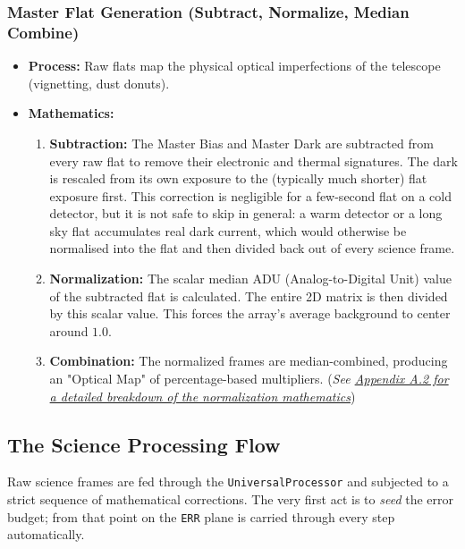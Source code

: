 \documentclass[11pt,a4paper]{article}
\begin{document}
\subsubsection{Master Flat Generation (Subtract, Normalize, Median Combine)}
\begin{itemize}[leftmargin=*]
    \item \textbf{Process:} Raw flats map the physical optical imperfections of the telescope (vignetting, dust donuts). 
    \item \textbf{Mathematics:} 
    \begin{enumerate}
        \item \textbf{Subtraction:} The Master Bias and Master Dark are subtracted from every raw flat to remove their electronic and thermal signatures. The dark is rescaled from its own exposure to the (typically much shorter) flat exposure first. This correction is negligible for a few-second flat on a cold detector, but it is not safe to skip in general: a warm detector or a long sky flat accumulates real dark current, which would otherwise be normalised into the flat and then divided back out of every science frame.
        \item \textbf{Normalization:} The scalar median ADU (Analog-to-Digital Unit) value of the subtracted flat is calculated. The entire 2D matrix is then divided by this scalar value. This forces the array's average background to center around $1.0$.
        \item \textbf{Combination:} The normalized frames are median-combined, producing an "Optical Map" of percentage-based multipliers. (\textit{See \hyperref[app:flat]{Appendix A.2 for a detailed breakdown of the normalization mathematics}})
    \end{enumerate}
\end{itemize}

\subsection{The Science Processing Flow}
Raw science frames are fed through the \texttt{UniversalProcessor} and subjected to a strict sequence of mathematical corrections. The very first act is to \emph{seed} the error budget; from that point on the \texttt{ERR} plane is carried through every step automatically.
\end{document}
